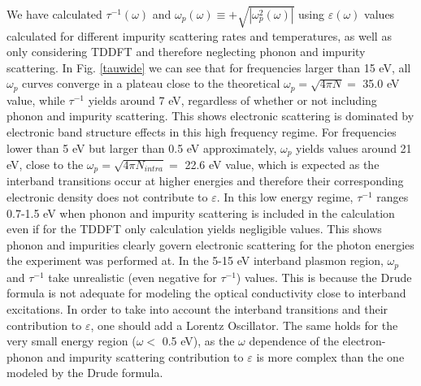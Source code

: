 \documentclass[11pt,titlepage,a4paper,twoside]{article}
\begin{document}
We have calculated $\tau^{-1}(\omega)$ and $\omega_p(\omega)\equiv+\sqrt{|\omega_p^2(\omega)|}$ using $\varepsilon(\omega)$ values calculated for different impurity scattering rates and temperatures, as well as only considering TDDFT and therefore neglecting
phonon and impurity scattering. In Fig. \ref{tauwide} we can see that for frequencies larger than 15 eV, all $\omega_p$ curves converge in a plateau close to the theoretical $\omega_p=\sqrt{4\pi N}=$ 35.0 eV value, while
$\tau^{-1}$ yields around 7 eV, regardless of whether or not including phonon and impurity scattering. This shows electronic scattering is dominated by electronic band structure effects in this high frequency regime.
For frequencies lower than 5 eV but larger than 0.5 eV approximately, $\omega_p$ yields values around 21 eV, close to the $\omega_p=\sqrt{4\pi N_{intra}}=$ 22.6 eV value, which is expected as the interband transitions occur at higher energies and therefore their corresponding electronic density 
does not contribute to $\varepsilon$. In this low energy regime, $\tau^{-1}$ ranges 0.7-1.5 eV when phonon and impurity scattering is included in the calculation even if for the TDDFT only calculation yields negligible values. This shows phonon and impurities
clearly govern electronic scattering for the photon energies the experiment was performed at.  
In the 5-15 eV interband plasmon region, $\omega_p$ and $\tau^{-1}$ take unrealistic
(even negative for $\tau^{-1}$) values. This is because the Drude formula is not adequate for modeling the optical conductivity close to interband excitations. In order to take into account the interband transitions and their contribution to
$\varepsilon$, one should add a Lorentz Oscillator. The same holds for the very small energy region ($\omega<$ 0.5 eV), as the $\omega$ dependence of the electron-phonon and impurity scattering contribution to $\varepsilon$ is more complex
than the one modeled by the Drude formula.
\end{document}
